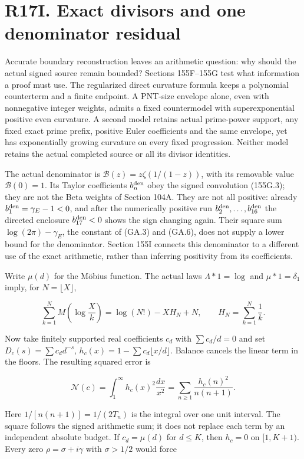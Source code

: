 \documentclass[
  11pt,
]{book}
\begin{document}
\section{R17I. Exact divisors and one denominator
residual}\label{r17i.-exact-divisors-and-one-denominator-residual}

Accurate boundary reconstruction leaves an arithmetic question: why
should the actual signed source remain bounded? Sections 155F--155G test
what information a proof must use. The regularized direct curvature
formula keeps a polynomial counterterm and a finite endpoint. A PNT-size
envelope alone, even with nonnegative integer weights, admits a fixed
countermodel with superexponential positive even curvature. A second
model retains actual prime-power support, any fixed exact prime prefix,
positive Euler coefficients and the same envelope, yet has exponentially
growing curvature on every fixed progression. Neither model retains the
actual completed source or all its divisor identities.

The actual denominator is \(\mathcal B(z)=z\zeta(1/(1-z))\), with its
removable value \(\mathcal B(0)=1\). Its Taylor coefficients
\(b_n^{\rm den}\) obey the signed convolution (155G.3); they are not the
Beta weights of Section 104A. They are not all positive: already
\(b_1^{\rm den}=\gamma_E-1<0\), and after the numerically positive run
\(b_2^{\rm den},\ldots,b_{16}^{\rm den}\) the directed enclosure
\(b_{17}^{\rm den}<0\) shows the sign changing again. Their square sum
\(\log(2\pi)-\gamma_E\), the constant of (GA.3) and (GA.6), does not
supply a lower bound for the denominator. Section 155I connects this
denominator to a different use of the exact arithmetic, rather than
inferring positivity from its coefficients.

Write \(\mu(d)\) for the Möbius function. The actual laws
\(\Lambda*1=\log\) and \(\mu*1=\delta_1\) imply, for
\(N=\lfloor X\rfloor\),

\[
 \sum_{k=1}^N M\!\left(\log\frac Xk\right)
 =\log(N!)-XH_N+N,\qquad H_N=\sum_{k=1}^N\frac1k.
\tag{DIV.1}
\]

Now take finitely supported real coefficients \(c_d\) with
\(\sum c_d/d=0\) and set \(D_c(s)=\sum c_dd^{-s}\),
\(h_c(x)=1-\sum c_d\lfloor x/d\rfloor\). Balance cancels the linear term
in the floors. The resulting squared error is

\[
\boxed{\mathscr N(c)=\int_1^\infty h_c(x)^2\frac{dx}{x^2}
=\sum_{n\ge1}\frac{h_c(n)^2}{n(n+1)}.}
\tag{DIV.2}
\]

Here \(1/[n(n+1)]=1/(2T_n)\) is the integral over one unit interval. The
square follows the signed arithmetic sum; it does not replace each term
by an independent absolute budget. If \(c_d=\mu(d)\) for \(d\le K\),
then \(h_c=0\) on \([1,K+1)\). Every zero \(\rho=\sigma+i\gamma\) with
\(\sigma>1/2\) would force
\end{document}
